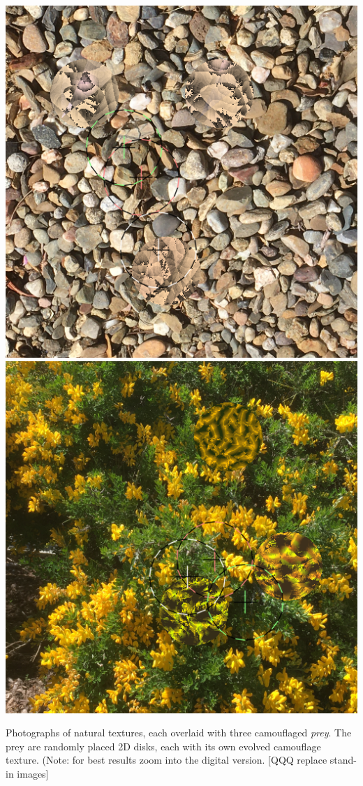 \documentclass[sigconf]{acmart}
\begin{document}
\begin{teaserfigure}
    \hfill
    \includegraphics[scale=0.24]{images/20221003_step_3667.png}
    \hfill
    \includegraphics[scale=0.24]{images/20220930_step_6093.png}
    \caption{Photographs of natural textures, each overlaid with three camouflaged \textit{prey}. The prey are randomly placed 2D disks, each with its own evolved camouflage texture. (Note: for best results zoom into the digital version. [QQQ replace stand-in images]}
    \label{fig:teaser}
    \vspace{3mm} %
\end{teaserfigure}
\end{document}
